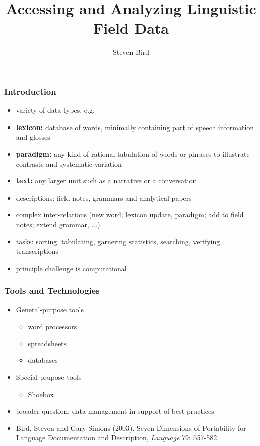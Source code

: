 \documentclass{beamer}             %
\title{Accessing and Analyzing Linguistic Field Data}
\author{Steven Bird}
\institute{
  University of Melbourne, AUSTRALIA
}
\begin{document}
\begin{frame}
  \titlepage
\end{frame}


\begin{frame}
  \frametitle{Introduction}
  \begin{itemize}
  \item variety of data types, e.g.
  \item \textbf{lexicon:} database of words, minimally containing part
    of speech information and glosses
  \item \textbf{paradigm:} any kind of rational
    tabulation of words or phrases to illustrate contrasts and systematic
    variation
  \item \textbf{text:} any larger unit such as a narrative or a
    conversation
  \item descriptions: field notes, grammars and analytical papers
  \item complex inter-relations (new word; lexicon update, paradigm;
    add to field notes; extend grammar, ...)
  \item tasks: sorting, tabulating, garnering statistics, searching,
  verifying transcriptions
  \item principle challenge is computational
  \end{itemize}

\end{frame}

\begin{frame}
\frametitle{Tools and Technologies}
\begin{itemize}
\item General-purpose tools
  \begin{itemize}
  \item word processors
  \item spreadsheets
  \item databases
  \end{itemize}
\item Special prupose tools
  \begin{itemize}
  \item Shoebox
  \end{itemize}
\item broader question: data management in support of best practices
\item Bird, Steven and Gary Simons (2003).  Seven Dimensions of Portability
    for Language Documentation and Description, \textit{Language} 79: 557-582.
\end{itemize}
\end{frame}
\end{document}
